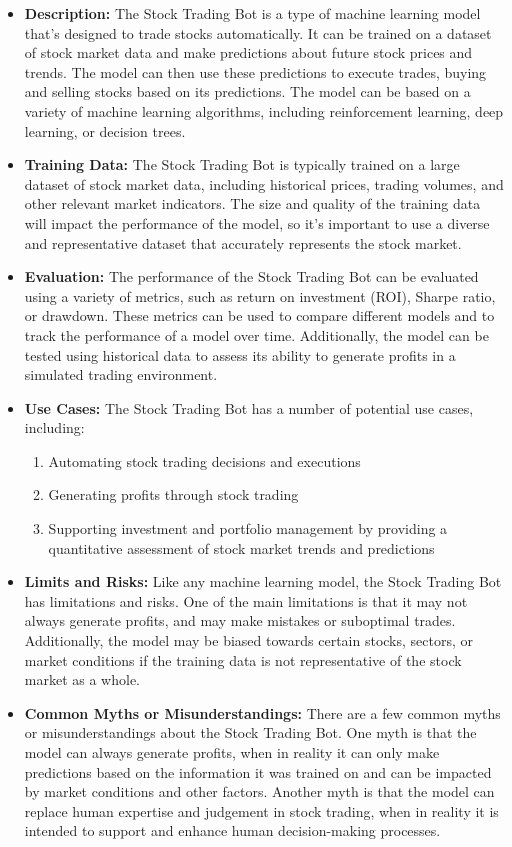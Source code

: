 \begin{itemize}
    \item \textbf{Description:} The Stock Trading Bot is a type of machine learning model that's designed to trade stocks automatically. It can be trained on a dataset of stock market data and make predictions about future stock prices and trends. The model can then use these predictions to execute trades, buying and selling stocks based on its predictions. The model can be based on a variety of machine learning algorithms, including reinforcement learning, deep learning, or decision trees.
    \item \textbf{Training Data:} The Stock Trading Bot is typically trained on a large dataset of stock market data, including historical prices, trading volumes, and other relevant market indicators. The size and quality of the training data will impact the performance of the model, so it's important to use a diverse and representative dataset that accurately represents the stock market.
    \item \textbf{Evaluation:} The performance of the Stock Trading Bot can be evaluated using a variety of metrics, such as return on investment (ROI), Sharpe ratio, or drawdown. These metrics can be used to compare different models and to track the performance of a model over time. Additionally, the model can be tested using historical data to assess its ability to generate profits in a simulated trading environment.
    \item \textbf{Use Cases:} The Stock Trading Bot has a number of potential use cases, including:
        \begin{enumerate}  
            \item Automating stock trading decisions and executions
            \item Generating profits through stock trading
            \item Supporting investment and portfolio management by providing a quantitative assessment of stock market trends and predictions
        \end{enumerate}
    \item \textbf{Limits and Risks:} Like any machine learning model, the Stock Trading Bot has limitations and risks. One of the main limitations is that it may not always generate profits, and may make mistakes or suboptimal trades. Additionally, the model may be biased towards certain stocks, sectors, or market conditions if the training data is not representative of the stock market as a whole.
    \item \textbf{Common Myths or Misunderstandings:} There are a few common myths or misunderstandings about the Stock Trading Bot. One myth is that the model can always generate profits, when in reality it can only make predictions based on the information it was trained on and can be impacted by market conditions and other factors. Another myth is that the model can replace human expertise and judgement in stock trading, when in reality it is intended to support and enhance human decision-making processes.
\end{itemize}

